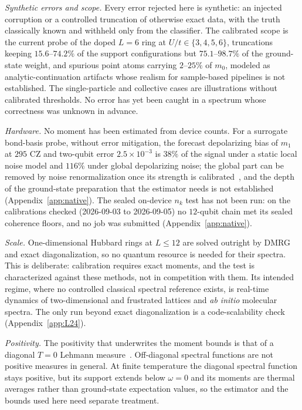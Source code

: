 \documentclass[submission, PhysCore]{SciPost}
\begin{document}
\emph{Synthetic errors and scope.} Every error rejected here is synthetic: an injected corruption or a controlled truncation of otherwise exact data, with the truth classically known and withheld only from the classifier. The calibrated scope is the current probe of the doped $L=6$ ring at $U/t\in\{3,4,5,6\}$, truncations keeping $15.6$--$74.2\%$ of the support configurations but $75.1$--$98.7\%$ of the ground-state weight, and spurious point atoms carrying $2$--$25\%$ of $m_0$, modeled as analytic-continuation artifacts whose realism for sample-based pipelines is not established. The single-particle and collective cases are illustrations without calibrated thresholds. No error has yet been caught in a spectrum whose correctness was unknown in advance.

\emph{Hardware.} No moment has been estimated from device counts. For a surrogate bond-basis probe, without error mitigation, the forecast depolarizing bias of $m_1$ at $295$ CZ and two-qubit error $2.5\times10^{-3}$ is $38\%$ of the signal under a static local noise model and $116\%$ under global depolarizing noise; the global part can be removed by noise renormalization once its strength is calibrated~\cite{Vovrosh2021,Kiss2025}, and the depth of the ground-state preparation that the estimator needs is not established (Appendix~\ref{app:native}). The sealed on-device $n_k$ test has not been run: on the calibrations checked (2026-09-03 to 2026-09-05) no $12$-qubit chain met its sealed coherence floors, and no job was submitted (Appendix~\ref{app:native}).

\emph{Scale.} One-dimensional Hubbard rings at $L\le 12$ are solved outright by DMRG and exact diagonalization, so no quantum resource is needed for their spectra. This is deliberate: calibration requires exact moments, and the test is characterized against these methods, not in competition with them. Its intended regime, where no controlled classical spectral reference exists, is real-time dynamics of two-dimensional and frustrated lattices and \emph{ab initio} molecular spectra. The only run beyond exact diagonalization is a code-scalability check (Appendix~\ref{app:L24}).

\emph{Positivity.} The positivity that underwrites the moment bounds is that of a diagonal $T=0$ Lehmann measure~\cite{Lehmann1954}. Off-diagonal spectral functions are not positive measures in general. At finite temperature the diagonal spectral function stays positive, but its support extends below $\omega=0$ and its moments are thermal averages rather than ground-state expectation values, so the estimator and the bounds used here need separate treatment.
\end{document}
